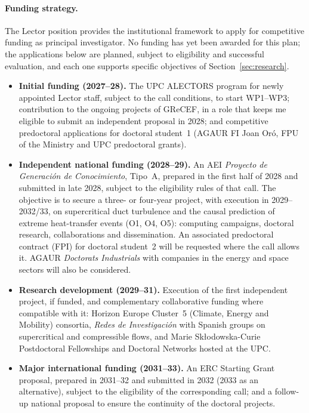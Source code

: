 \documentclass[11pt]{article}
\begin{document}
\paragraph{Funding strategy.} The Lector position provides the institutional framework to
apply for competitive funding as principal investigator. No funding has yet been awarded for
this plan; the applications below are planned, subject to eligibility and successful
evaluation, and each one supports specific objectives of Section~\ref{sec:research}.
\begin{itemize}
  \item \textbf{Initial funding (2027--28).} The UPC ALECTORS program for newly appointed
  Lector staff, subject to the call conditions, to start WP1--WP3; contribution to the
  ongoing projects of GReCEF, in a role that keeps me eligible to submit an independent
  proposal in 2028; and competitive predoctoral applications for doctoral student~1 (AGAUR
  FI Joan Or\'o, FPU of the Ministry and UPC predoctoral grants).
  \item \textbf{Independent national funding (2028--29).} An AEI \emph{Proyecto de
  Generaci\'on de Conocimiento}, Tipo~A, prepared in the first half of 2028 and submitted in
  late 2028, subject to the eligibility rules of that call. The objective is to secure a three-
  or four-year project, with execution in 2029--2032/33, on supercritical duct turbulence and
  the causal prediction of extreme heat-transfer events (O1, O4, O5): computing campaigns,
  doctoral research, collaborations and dissemination. An associated predoctoral contract
  (FPI) for doctoral student~2 will be requested where the call allows it. AGAUR
  \emph{Doctorats Industrials} with companies in the energy and space sectors will also be
  considered.
  \item \textbf{Research development (2029--31).} Execution of the first independent project,
  if funded, and complementary collaborative funding where compatible with it: Horizon
  Europe Cluster~5 (Climate, Energy and Mobility) consortia, \emph{Redes de Investigaci\'on}
  with Spanish groups on supercritical and compressible flows, and Marie
  Sk\l{}odowska-Curie Postdoctoral Fellowships and Doctoral Networks hosted at the UPC.
  \item \textbf{Major international funding (2031--33).} An ERC Starting Grant proposal,
  prepared in 2031--32 and submitted in 2032 (2033 as an alternative), subject to the
  eligibility of the corresponding call; and a follow-up national proposal to ensure the
  continuity of the doctoral projects.
\end{itemize}
\end{document}
